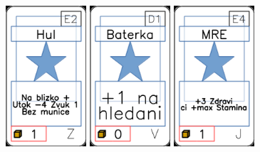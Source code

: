 \documentclass[a4paper]{article}
\begin{document}
	\includegraphics[width=3.0cm]{img-1_81}
	\includegraphics[width=3.0cm]{img-1_75}
	\includegraphics[width=3.0cm]{img-1_23}
\end{document}
